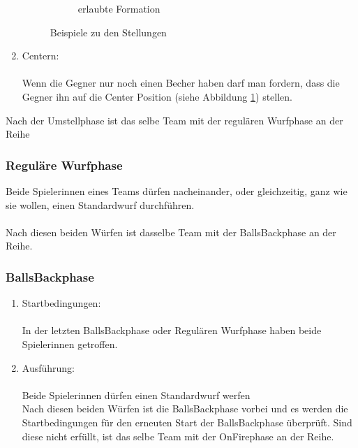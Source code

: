 \documentclass[a5paper, 12pt]{book}
\begin{document}
\begin{enumerate}[(1)]
\begin{figure}[h!]
\begin{subfigure}[b]{0.434\textwidth}
         \caption{erlaubte Formation}
     \end{subfigure}
        \caption{Beispiele zu den Stellungen}
        \label{fig:three graphs}
\end{figure}
\item
    Centern: \\\\
    Wenn die Gegner nur noch einen Becher haben darf man fordern, dass die Gegner ihn auf die Center Position (siehe Abbildung \ref{fig:three graphs}) stellen. 
\end{enumerate}
Nach der Umstellphase ist das selbe Team mit der regulären Wurfphase an der Reihe
\subsubsection{Reguläre Wurfphase} \label{subsub:reguläreWurfphase}
Beide Spielerinnen eines Teams dürfen nacheinander, oder gleichzeitig, ganz wie sie wollen, einen Standardwurf durchführen.\\\\ Nach diesen beiden Würfen ist dasselbe Team mit der BallsBackphase an der Reihe.
\subsubsection{BallsBackphase}\label{subsub:ballsbackphase}
\begin{enumerate}[(1)]
    \item Startbedingungen:\\\\
    In der letzten BallsBackphase oder Regulären Wurfphase haben beide Spielerinnen getroffen.
    \item Ausführung:\\\\
    Beide Spielerinnen dürfen einen Standardwurf werfen\\
Nach diesen beiden Würfen ist die BallsBackphase vorbei und es werden die Startbedingungen für den erneuten Start der BallsBackphase überprüft. Sind diese nicht erfüllt, ist das selbe Team mit der OnFirephase an der Reihe.

\end{enumerate}
\end{document}
